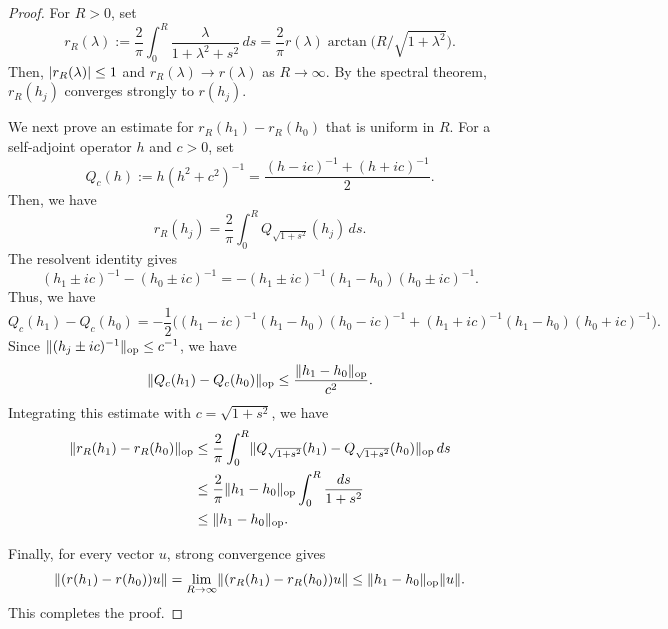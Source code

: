 \documentclass[a4paper,oneside,12pt]{amsart}
\theoremstyle{plain}
\theoremstyle{definition}
\theoremstyle{remark}
\DeclarePairedDelimiter{\abs}{\lvert}{\rvert}
\DeclarePairedDelimiter{\norm}{\lVert}{\rVert}
\DeclarePairedDelimiter{\operatornorm}{\lVert}{\rVert_{\mathrm{op}}}
\begin{document}
\begin{proof}
  For $R>0$, set
  \begin{equation}
    r_R(\lambda) := \frac{2}{\pi} \int_0^R \frac{\lambda}{1+\lambda^2+s^2} \,ds = \frac{2}{\pi} r(\lambda) \arctan \bigl(R/\sqrt{1+\lambda^2}\bigr).
  \end{equation}
  Then, $\abs{r_R(\lambda)} \le 1$ and $r_R(\lambda) \to r(\lambda)$ as $R \to \infty$.
  By the spectral theorem, $r_R(h_j)$ converges strongly to $r(h_j)$.

  We next prove an estimate for $r_R(h_1)-r_R(h_0)$ that is uniform in $R$.
  For a self-adjoint operator $h$ and $c>0$, set
  \begin{equation}
    Q_c(h) := h(h^2+c^2)^{-1} = \frac{(h-ic)^{-1}+(h+ic)^{-1}}{2}.
  \end{equation}
  Then, we have
  \begin{equation}
    r_R(h_j) = \frac{2}{\pi} \int_0^R Q_{\sqrt{1+s^2}}(h_j) \,ds.
  \end{equation}
  The resolvent identity gives
  \begin{equation}
    (h_1 \pm ic)^{-1}-(h_0 \pm ic)^{-1} = -(h_1 \pm ic)^{-1} (h_1-h_0) (h_0 \pm ic)^{-1}.
  \end{equation}
  Thus, we have
  \begin{equation}
    Q_c(h_1)-Q_c(h_0) = -\frac{1}{2} \bigl( (h_1-ic)^{-1} (h_1-h_0) (h_0-ic)^{-1} + (h_1+ic)^{-1} (h_1-h_0) (h_0+ic)^{-1} \bigr).
  \end{equation}
  Since $\operatornorm{(h_j \pm ic)^{-1}} \le c^{-1}$, we have
  \begin{equation}
    \operatornorm{Q_c(h_1)-Q_c(h_0)} \le \frac{\operatornorm{h_1-h_0}}{c^2}.
  \end{equation}
  Integrating this estimate with $c=\sqrt{1+s^2}$, we have
  \begin{equation}
    \begin{aligned}
    \operatornorm{r_R(h_1)-r_R(h_0)} \le{}& \frac{2}{\pi} \int_0^R \operatornorm{Q_{\sqrt{1+s^2}}(h_1) -Q_{\sqrt{1+s^2}}(h_0)}\,ds \\
    \le{}& \frac{2}{\pi} \operatornorm{h_1-h_0} \int_0^R \frac{ds}{1+s^2} \\
    \le{}& \operatornorm{h_1-h_0}.
    \end{aligned}
  \end{equation}

  Finally, for every vector $u$, strong convergence gives
  \begin{equation}
    \norm*{(r(h_1)-r(h_0))u} = \lim_{R \to \infty} \norm*{(r_R(h_1)-r_R(h_0))u} \le \operatornorm{h_1-h_0}\norm{u}.
  \end{equation}
  This completes the proof.
\end{proof}
\end{document}
